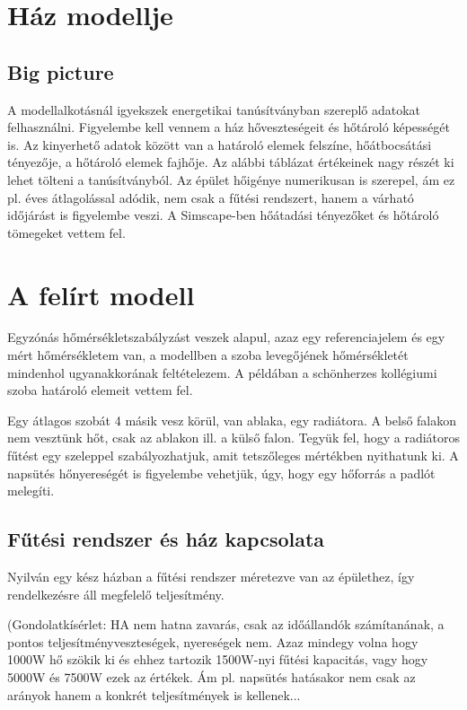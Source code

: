 \section{Ház modellje}

\subsection{Big picture}

A modellalkotásnál igyekszek energetikai tanúsítványban szereplő adatokat felhasználni.
Figyelembe kell vennem a ház hőveszteségeit és hőtároló képességét is.
Az kinyerhető adatok között van a határoló elemek felszíne, hőátbocsátási tényezője, a hőtároló elemek fajhője. Az alábbi táblázat értékeinek nagy részét ki lehet tölteni a tanúsítványból.
Az épület hőigénye numerikusan is szerepel, ám ez pl. éves átlagolással adódik, nem csak a fűtési rendszert, hanem a várható időjárást is figyelembe veszi.
A Simscape-ben hőátadási tényezőket és hőtároló tömegeket vettem fel.


\section{A felírt modell}

Egyzónás hőmérsékletszabályzást veszek alapul, azaz egy referenciajelem és egy mért hőmérsékletem van, a modellben a szoba levegőjének hőmérsékletét mindenhol ugyanakkorának feltételezem. A példában a schönherzes kollégiumi szoba határoló elemeit vettem fel.


Egy átlagos szobát 4 másik vesz körül, van ablaka, egy radiátora. A belső falakon nem vesztünk hőt, csak az ablakon ill. a külső falon. Tegyük fel, hogy a radiátoros fűtést egy szeleppel szabályozhatjuk, amit tetszőleges mértékben nyithatunk ki.
A napsütés hőnyereségét is figyelembe vehetjük, úgy, hogy egy hőforrás a padlót melegíti.



\subsection{Fűtési rendszer és ház kapcsolata}

Nyilván egy kész házban a fűtési rendszer méretezve van az épülethez, így rendelkezésre áll megfelelő teljesítmény.

(Gondolatkísérlet: HA nem hatna zavarás, csak az időállandók számítanának, a pontos teljesítményveszteségek, nyereségek nem. Azaz mindegy volna hogy 1000W hő szökik ki és ehhez tartozik 1500W-nyi fűtési kapacitás, vagy hogy 5000W és 7500W ezek az értékek. Ám pl. napsütés hatásakor nem csak az arányok hanem a konkrét teljesítmények is kellenek...

